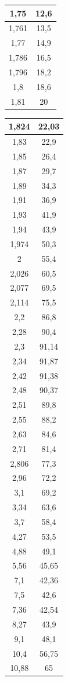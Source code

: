 \documentclass[a4paper,14pt]{extarticle}
\begin{document}
\begin{table}[h!]
\begin{tabular}{|c|c|}
1,75	&	12,6	\\ \hline
1,761	&	13,5	\\ \hline
1,77	&	14,9	\\ \hline
1,786	&	16,5	\\ \hline
1,796	&	18,2	\\ \hline
1,8	&	18,6	\\ \hline
1,81	&	20	\\ \hline
		\end{tabular}
		\begin{tabular}{|c|c|} 
			\hline
			1,824	&	22,03	\\ \hline
1,83	&	22,9	\\ \hline
1,85	&	26,4	\\ \hline
1,87	&	29,7	\\ \hline
1,89	&	34,3	\\ \hline
1,91	&	36,9	\\ \hline
1,93	&	41,9	\\ \hline
1,94	&	43,9	\\ \hline
1,974	&	50,3	\\ \hline
2	&	55,4	\\ \hline
2,026	&	60,5	\\ \hline
2,077	&	69,5	\\ \hline
2,114	&	75,5	\\ \hline
2,2	&	86,8	\\ \hline
2,28	&	90,4	\\ \hline
2,3	&	91,14	\\ \hline
2,34	&	91,87	\\ \hline
2,42	&	91,38	\\ \hline
2,48	&	90,37	\\ \hline
2,51	&	89,8	\\ \hline
2,55	&	88,2	\\ \hline
2,63	&	84,6	\\ \hline
2,71	&	81,4	\\ \hline
2,806	&	77,3	\\ \hline
2,96	&	72,2	\\ \hline
3,1	&	69,2	\\ \hline
3,34	&	63,6	\\ \hline
3,7	&	58,4	\\ \hline
4,27	&	53,5	\\ \hline
4,88	&	49,1	\\ \hline
5,56	&	45,65	\\ \hline
7,1	&	42,36	\\ \hline
7,5	&	42,6	\\ \hline
7,36	&	42,54	\\ \hline
8,27	&	43,9	\\ \hline
9,1	&	48,1	\\ \hline
10,4	&	56,75	\\ \hline
10,88	&	65	\\ \hline
		\end{tabular}
	\end{table}
\end{document}
